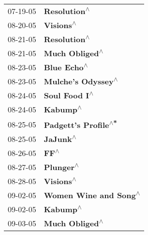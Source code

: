 \begin{supertabular}{p{0.25\columnwidth}p{0.75\columnwidth}}
 07-19-05 &                                                               \textbf{Resolution\textsuperscript{$\wedge$}} \\
 08-20-05 &                                                                  \textbf{Visions\textsuperscript{$\wedge$}} \\
 08-21-05 &                                                               \textbf{Resolution\textsuperscript{$\wedge$}} \\
 08-21-05 &                                                             \textbf{Much Obliged\textsuperscript{$\wedge$}} \\
 08-23-05 &                                                                \textbf{Blue Echo\textsuperscript{$\wedge$}} \\
 08-23-05 &                                                         \textbf{Mulche's Odyssey\textsuperscript{$\wedge$}} \\
 08-24-05 &                                                              \textbf{Soul Food I\textsuperscript{$\wedge$}} \\
 08-24-05 &                                                                   \textbf{Kabump\textsuperscript{$\wedge$}} \\
 08-25-05 &                                                       \textbf{Padgett's Profile\textsuperscript{$\wedge$*}} \\
 08-25-05 &                                                                   \textbf{JaJunk\textsuperscript{$\wedge$}} \\
 08-26-05 &                                                                       \textbf{FF\textsuperscript{$\wedge$}} \\
 08-27-05 &                                                                  \textbf{Plunger\textsuperscript{$\wedge$}} \\
 08-28-05 &                                                                  \textbf{Visions\textsuperscript{$\wedge$}} \\
 09-02-05 &                                                      \textbf{Women Wine and Song\textsuperscript{$\wedge$}} \\
 09-02-05 &                                                                   \textbf{Kabump\textsuperscript{$\wedge$}} \\
 09-03-05 &                                                             \textbf{Much Obliged\textsuperscript{$\wedge$}} \\

\end{supertabular}
